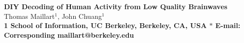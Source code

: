 \documentclass[10pt]{article}
\date{}
\begin{document}
\begin{flushleft}
{\Large
\textbf{DIY Decoding of Human Activity from Low Quality Brainwaves}
}
\\
Thomas Maillart$^{1}$, 
John Chuang$^{1}$
\\
\bf{1} School of Information, UC Berkeley, Berkeley, CA, USA
$\ast$ E-mail: Corresponding maillart@berkeley.edu
\end{flushleft}










%
%
%
%









%
\end{document}

